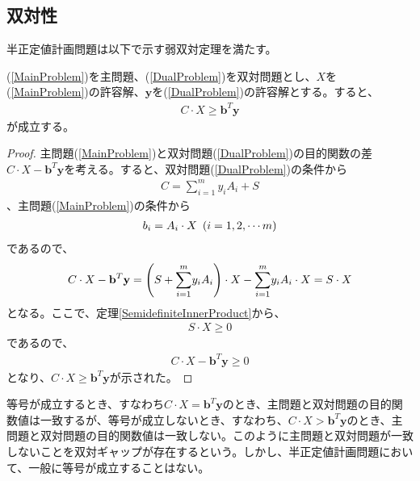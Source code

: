 \subsection{双対性}
半正定値計画問題は以下で示す弱双対定理を満たす。
\begin{theorem}
  (\ref{MainProblem})を主問題、(\ref{DualProblem})を双対問題とし、$X$を(\ref{MainProblem})の許容解、$\mathbf{y}$を(\ref{DualProblem})の許容解とする。すると、
  \begin{align*}
    C \cdot X \geq \mathbf{b}^T \mathbf{y}
  \end{align*}
  が成立する。
\end{theorem}
\begin{proof}
  主問題(\ref{MainProblem})と双対問題(\ref{DualProblem})の目的関数の差$C \cdot X - \mathbf{b}^T \mathbf{y}$を考える。すると、双対問題(\ref{DualProblem})の条件から
  \begin{align*}
    C = \displaystyle{\sum_{i = 1}^m} y_i A_i + S
  \end{align*}
  、主問題(\ref{MainProblem})の条件から
  \begin{align*}
    b_i = A_i \cdot X \,\, \parenthesis(i = 1, 2, \cdots m)
  \end{align*}
  であるので、
  \begin{align*}
    C \cdot X - \mathbf{b}^T \mathbf{y} = \parenthesis(S + \displaystyle{\sum_{i = 1}^m} y_i A_i) \cdot X - \displaystyle{\sum_{i = 1}^m} y_i A_i \cdot X = S \cdot X
  \end{align*}
  となる。ここで、定理\ref{SemidefiniteInnerProduct}から、
  \begin{align*}
    S \cdot X \geq 0
  \end{align*}
  であるので、
  \begin{align*}
    C \cdot X - \mathbf{b}^T \mathbf{y} \geq 0
  \end{align*}
  となり、$C \cdot X \geq \mathbf{b}^T \mathbf{y}$が示された。
\end{proof}
等号が成立するとき、すなわち$C \cdot X = \mathbf{b}^T \mathbf{y}$のとき、主問題と双対問題の目的関数値は一致するが、等号が成立しないとき、すなわち、$C \cdot X > \mathbf{b}^T \mathbf{y}$のとき、主問題と双対問題の目的関数値は一致しない。このように主問題と双対問題が一致しないことを双対ギャップが存在するという。しかし、半正定値計画問題において、一般に等号が成立することはない\cite*{SemidefiniteDuality}。
